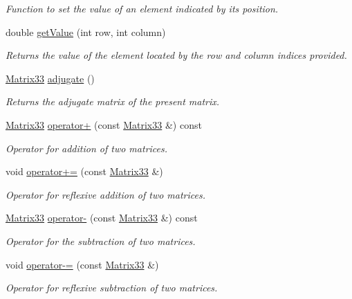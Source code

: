 \begin{DoxyCompactItemize}
\begin{DoxyCompactList}\small\item\em Function to set the value of an element indicated by its position. \end{DoxyCompactList}\item 
double \hyperlink{classMatrix33_a849bbdf7b456ddacf7185b087fca4015}{get\-Value} (int row, int column)
\begin{DoxyCompactList}\small\item\em Returns the value of the element located by the row and column indices provided. \end{DoxyCompactList}\item 
\hyperlink{classMatrix33}{Matrix33} \hyperlink{classMatrix33_a4e64ab5af4921c24b8270a0c9050f4ba}{adjugate} ()
\begin{DoxyCompactList}\small\item\em Returns the adjugate matrix of the present matrix. \end{DoxyCompactList}\item 
\hyperlink{classMatrix33}{Matrix33} \hyperlink{classMatrix33_adc58ec5739c9250ff1150c725d0e868e}{operator+} (const \hyperlink{classMatrix33}{Matrix33} \&) const 
\begin{DoxyCompactList}\small\item\em Operator for addition of two matrices. \end{DoxyCompactList}\item 
void \hyperlink{classMatrix33_acb59e59d3937e075521f478ba83b7165}{operator+=} (const \hyperlink{classMatrix33}{Matrix33} \&)
\begin{DoxyCompactList}\small\item\em Operator for reflexive addition of two matrices. \end{DoxyCompactList}\item 
\hyperlink{classMatrix33}{Matrix33} \hyperlink{classMatrix33_a372f71ec208bb6d3045acd4324b7cb06}{operator-\/} (const \hyperlink{classMatrix33}{Matrix33} \&) const 
\begin{DoxyCompactList}\small\item\em Operator for the subtraction of two matrices. \end{DoxyCompactList}\item 
void \hyperlink{classMatrix33_abc889e10a9c7c532195c7031c1344a74}{operator-\/=} (const \hyperlink{classMatrix33}{Matrix33} \&)
\begin{DoxyCompactList}\small\item\em Operator for reflexive subtraction of two matrices. \end{DoxyCompactList}\item 

\end{DoxyCompactItemize}
